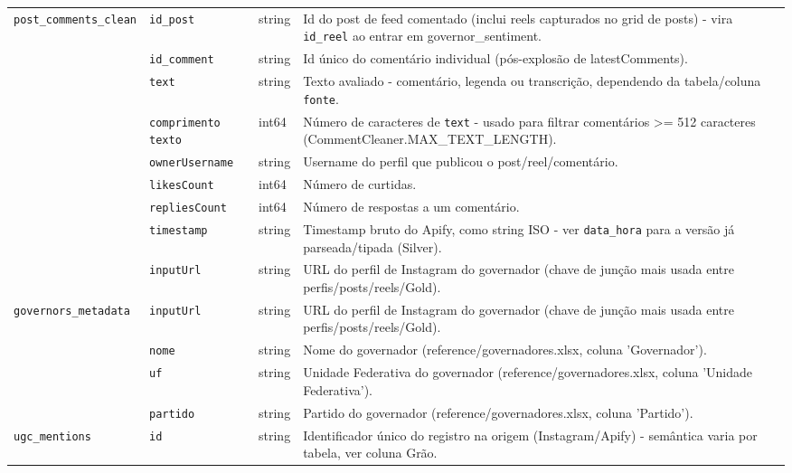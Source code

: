 \begin{footnotesize}
\begin{longtable}{p{3.2cm}p{3.0cm}p{2.0cm}p{6.0cm}}
\texttt{post\_\allowbreak{}comments\_\allowbreak{}clean} & \texttt{id\_\allowbreak{}post} & string & Id do post de feed comentado (inclui reels capturados no grid de posts) - vira \texttt{id\_\allowbreak{}reel} ao entrar em governor\_\allowbreak{}sentiment. \\
\texttt{} & \texttt{id\_\allowbreak{}comment} & string & Id único do comentário individual (pós-explosão de latestComments). \\
\texttt{} & \texttt{text} & string & Texto avaliado - comentário, legenda ou transcrição, dependendo da tabela/\allowbreak{}coluna \texttt{fonte}. \\
\texttt{} & \texttt{comprimento texto} & int64 & Número de caracteres de \texttt{text} - usado para filtrar comentários >= 512 caracteres (CommentCleaner.MAX\_\allowbreak{}TEXT\_\allowbreak{}LENGTH). \\
\texttt{} & \texttt{ownerUsername} & string & Username do perfil que publicou o post/\allowbreak{}reel/\allowbreak{}comentário. \\
\texttt{} & \texttt{likesCount} & int64 & Número de curtidas. \\
\texttt{} & \texttt{repliesCount} & int64 & Número de respostas a um comentário. \\
\texttt{} & \texttt{timestamp} & string & Timestamp bruto do Apify, como string ISO - ver \texttt{data\_\allowbreak{}hora} para a versão já parseada/\allowbreak{}tipada (Silver). \\
\texttt{} & \texttt{inputUrl} & string & URL do perfil de Instagram do governador (chave de junção mais usada entre perfis/\allowbreak{}posts/\allowbreak{}reels/\allowbreak{}Gold). \\
\texttt{governors\_\allowbreak{}metadata} & \texttt{inputUrl} & string & URL do perfil de Instagram do governador (chave de junção mais usada entre perfis/\allowbreak{}posts/\allowbreak{}reels/\allowbreak{}Gold). \\
\texttt{} & \texttt{nome} & string & Nome do governador (reference/\allowbreak{}governadores.xlsx, coluna 'Governador'). \\
\texttt{} & \texttt{uf} & string & Unidade Federativa do governador (reference/\allowbreak{}governadores.xlsx, coluna 'Unidade Federativa'). \\
\texttt{} & \texttt{partido} & string & Partido do governador (reference/\allowbreak{}governadores.xlsx, coluna 'Partido'). \\
\texttt{ugc\_\allowbreak{}mentions} & \texttt{id} & string & Identificador único do registro na origem (Instagram/\allowbreak{}Apify) - semântica varia por tabela, ver coluna Grão. \\

\end{longtable}
\end{footnotesize}
